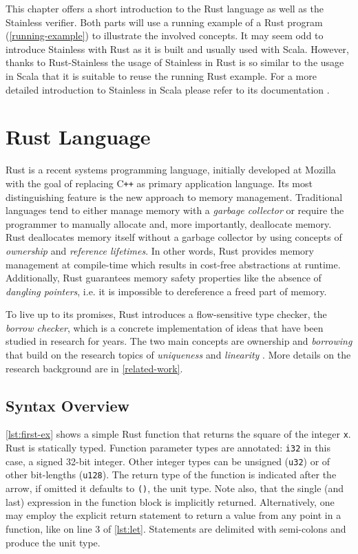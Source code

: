 This chapter offers a short introduction to the Rust language as well as the
Stainless verifier. Both parts will use a running example of a Rust program
(\autoref{running-example}) to illustrate the involved concepts. It may seem odd
to introduce Stainless with Rust  as it is built and usually used with Scala.
However, thanks to Rust-Stainless the  usage of Stainless in Rust is so similar
to the usage in Scala that it is suitable  to reuse the running Rust example.
For a more detailed introduction to Stainless in Scala please refer to its
documentation \cite{stainless-doc}.

\section{Rust Language}

Rust \cite{rust2, rust1} is a recent systems programming language, initially
developed at Mozilla with the goal of replacing C\texttt{++} as primary
application language. Its most distinguishing feature is the new approach to
memory management. Traditional languages tend to either manage memory with a
\emph{garbage collector} or require the programmer to manually allocate and,
more importantly, deallocate memory. Rust deallocates memory itself without a
garbage collector by using concepts of \emph{ownership} and \emph{reference
lifetimes}. In other words, Rust provides memory management at compile-time
which results in cost-free abstractions at runtime. Additionally, Rust
guarantees memory safety properties like  the absence of \emph{dangling
pointers}, i.e. it is impossible to dereference a freed part of memory.

To live up to its promises, Rust introduces a flow-sensitive type checker, the
\emph{borrow checker}, which is a concrete implementation of ideas that have
been studied in research for years. The two main concepts are ownership
\cite{ownership-types} and \emph{borrowing} that build on the research topics of
\emph{uniqueness} \cite{alias-burying} and \emph{linearity}
\cite{Wadler90lineartypes, once-upon-a-type}. More details on the research
background are in \autoref{related-work}.


\subsection{Syntax Overview}

\autoref{lst:first-ex} shows a simple Rust function that returns the square of
the integer \lstinline!x!. Rust is statically typed. Function parameter types
are annotated: \lstinline!i32! in this case, a signed 32-bit integer. Other
integer types can be unsigned (\lstinline!u32!) or of other bit-lengths
(\lstinline!u128!). The return type of the function is indicated after the
arrow, if omitted it defaults to \lstinline!()!, the unit type. Note also, that
the single (and last) expression in the function block is implicitly returned.
Alternatively, one may employ the explicit return statement to return a value
from any point in a function, like on line 3 of \autoref{lst:let}. Statements
are delimited with semi-colons and produce the unit type.

